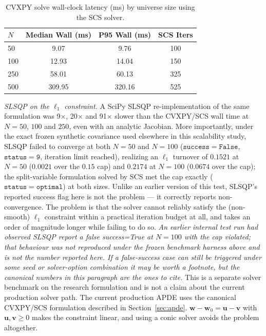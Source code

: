 \documentclass[conference]{IEEEtran}
\begin{document}
\begin{table}[t]
\caption{CVXPY solve wall-clock latency (ms) by universe size using the SCS solver.}
\label{tab:latency}
\centering
\footnotesize
\setlength{\tabcolsep}{5pt}
\renewcommand{\arraystretch}{1.15}
\begin{tabular}{@{}lccc@{}}
\toprule
$N$ & \textbf{Median Wall (ms)} & \textbf{P95 Wall (ms)} & \textbf{SCS Iters} \\
\midrule
50  & 9.07   & 9.76   & 100 \\
100 & 12.93  & 14.04  & 150 \\
250 & 58.01  & 60.13  & 325 \\
500 & 309.95 & 320.16 & 525 \\
\bottomrule
\end{tabular}
\end{table}

\emph{SLSQP on the $\ell_1$ constraint.} A SciPy SLSQP re-implementation
of the same formulation was 9$\times$, 20$\times$ and 91$\times$ slower
than the CVXPY/SCS wall time at $N=50$, $100$ and $250$, even with an
analytic Jacobian. More importantly, under the exact frozen synthetic
covariance used elsewhere in this scalability study, SLSQP failed to
converge at both $N=50$ and $N=100$ ($\mathtt{success=False}$,
$\mathtt{status=9}$, iteration limit reached), realizing an $\ell_1$
turnover of $0.1521$ at $N=50$ ($0.0021$ over the $0.15$ cap) and
$0.2174$ at $N=100$ ($0.0674$ over the cap); the split-variable
formulation solved by SCS met the cap exactly
($\mathtt{status=optimal}$) at both sizes. Unlike an earlier version of
this test, SLSQP's reported success flag here is not the problem --- it
correctly reports non-convergence. The problem is that the solver
cannot reliably satisfy the (non-smooth) $\ell_1$ constraint within a
practical iteration budget at all, and takes an order of magnitude
longer while failing to do so. \emph{An earlier internal test run had
observed SLSQP report a false success=True at $N=100$ with the cap
violated; that behaviour was not reproduced under the frozen benchmark
harness above and is not the number reported here. If a false-success
case can still be triggered under some seed or solver-option
combination it may be worth a footnote, but the canonical numbers in
this paragraph are the ones to cite.} This is a separate solver benchmark on the research formulation and is
not a claim about the current production solver path. The current
production APDE uses the canonical CVXPY/SCS formulation described in
Section~\ref{sec:apde}.
$\mathbf{w}-\mathbf{w}_0=\mathbf{u}-\mathbf{v}$ with
$\mathbf{u},\mathbf{v}\ge0$ makes the constraint linear, and using a
conic solver avoids the problem altogether.
\end{document}
